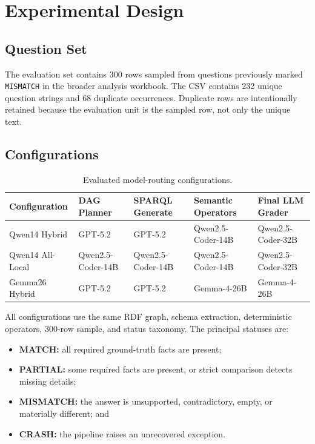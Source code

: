 \documentclass[11pt]{article}
\begin{document}
\section{Experimental Design}

\subsection{Question Set}

The evaluation set contains 300 rows sampled from questions previously marked \texttt{MISMATCH} in the broader analysis workbook. The CSV contains 232 unique question strings and 68 duplicate occurrences. Duplicate rows are intentionally retained because the evaluation unit is the sampled row, not only the unique text.

\subsection{Configurations}

\begin{table}[H]
\centering
\small
\caption{Evaluated model-routing configurations.}
\label{tab:configs}
\begin{tabular}{p{2.9cm}p{2.5cm}p{2.6cm}p{2.8cm}p{2.5cm}}
\toprule
\textbf{Configuration} & \textbf{DAG Planner} & \textbf{SPARQL Generate} & \textbf{Semantic Operators} & \textbf{Final LLM Grader}\\
\midrule
Qwen14 Hybrid & GPT-5.2 & GPT-5.2 & Qwen2.5-Coder-14B & Qwen2.5-Coder-32B\\
Qwen14 All-Local & Qwen2.5-Coder-14B & Qwen2.5-Coder-14B & Qwen2.5-Coder-14B & Qwen2.5-Coder-32B\\
Gemma26 Hybrid & GPT-5.2 & GPT-5.2 & Gemma-4-26B & Gemma-4-26B\\
\bottomrule
\end{tabular}
\end{table}

All configurations use the same RDF graph, schema extraction, deterministic operators, 300-row sample, and status taxonomy. The principal statuses are:

\begin{itemize}[leftmargin=*]
    \item \textbf{MATCH:} all required ground-truth facts are present;
    \item \textbf{PARTIAL:} some required facts are present, or strict comparison detects missing details;
    \item \textbf{MISMATCH:} the answer is unsupported, contradictory, empty, or materially different; and
    \item \textbf{CRASH:} the pipeline raises an unrecovered exception.
\end{itemize}
\end{document}
